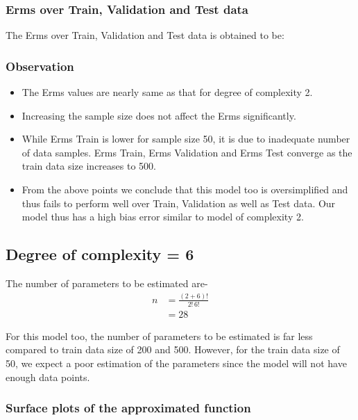 \documentclass[12pt,a4paper]{article}
\newcommand{\noi}{\noindent}
\begin{document}
\subsubsection{Erms over Train, Validation and Test data}

The Erms over Train, Validation and Test data is obtained to be:



\subsubsection{Observation}

\begin{itemize}
    \item The Erms values are nearly same as that for degree of complexity 2.
    \item Increasing the sample size does not affect the Erms significantly.
    \item While Erms Train is lower for sample size 50, it is due to inadequate number of data samples. Erms Train, Erms Validation and Erms Test converge as the train data size increases to 500.
    \item From the above points we conclude that this model too is oversimplified and thus fails to perform well over Train, Validation as well as Test data. Our model thus has a high bias error similar to model of complexity 2. 
\end{itemize}

\subsection{Degree of complexity = 6}
The number of parameters to be estimated are-
\begin{equation}
    \begin{split}
        n&=\frac{(2+6)!}{2!\,6!} \\
        &=28
    \end{split}
\end{equation}

\noi
For this model too, the number of parameters to be estimated is far less compared to train data size of 200 and 500. However, for the train data size of 50, we expect a poor estimation of the parameters since the model will not have enough data points. 

\subsubsection{Surface plots of the approximated function}
\end{document}
